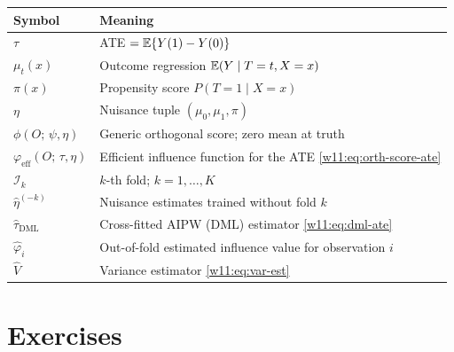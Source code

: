 \documentclass[master.tex]{subfiles}
\begin{document}
\begin{tcolorbox}[defstyle, title={Key Objects in This Chapter}]
\begin{center}
\renewcommand{\arraystretch}{1.4}
\begin{tabular}{lp{8.5cm}}
\hline
\textbf{Symbol} & \textbf{Meaning} \\
\hline
$\tau$
  & ATE $= \mathbb{E}\{Y(1)-Y(0)\}$ \\
$\mu_t(x)$
  & Outcome regression $\mathbb{E}(Y\mid T=t,X=x)$ \\
$\pi(x)$
  & Propensity score $P(T=1\mid X=x)$ \\
$\eta$
  & Nuisance tuple $(\mu_0,\mu_1,\pi)$ \\
$\phi(O;\,\psi,\eta)$
  & Generic orthogonal score; zero mean at truth \\
$\varphi_{\mathrm{eff}}(O;\,\tau,\eta)$
  & Efficient influence function for the ATE \eqref{w11:eq:orth-score-ate} \\
$\mathcal{I}_k$
  & $k$-th fold; $k=1,\ldots,K$ \\
$\hat\eta^{(-k)}$
  & Nuisance estimates trained without fold $k$ \\
$\hat\tau_{\mathrm{DML}}$
  & Cross-fitted AIPW (DML) estimator \eqref{w11:eq:dml-ate} \\
$\hat\varphi_i$
  & Out-of-fold estimated influence value for observation $i$ \\
$\hat{V}$
  & Variance estimator \eqref{w11:eq:var-est} \\
\hline
\end{tabular}
\end{center}
\end{tcolorbox}


\section*{Exercises}
\label{w11:sec:exercises}
\end{document}
